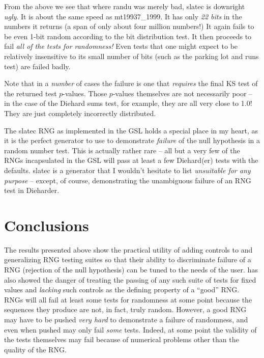 \documentclass{book}
\begin{document}
From the above we see that where randu was merely bad, slatec is
downright {\em ugly}.  It is about the same speed as mt19937\_1999.  It
has only {\em 22 bits} in the numbers it returns (a span of only about
four million numbers!)  It again fails to be even 1-bit random according
to the bit distribution test.  It then proceeds to fail {\em all of the
tests for randomness!} Even tests that one might expect to be relatively
insensitive to its small number of bits (such as the parking lot and
runs test) are failed badly.

Note that in a {\em number} of cases the failure is one that {\em
requires} the final KS test of the returned test $p$-values.  Those
$p$-values themselves are not necessarily poor -- in the case of the
Diehard sums test, for example, they are all very close to 1.0!  They
are just completely incorrectly distributed.

The slatec RNG as implemented in the GSL holds a special place in my
heart, as it is the perfect generator to use to demonstrate {\em
failure} of the null hypothesis in a random number test.  This is
actually rather rare -- all but a very few of the RNGs incapsulated in
the GSL will pass at least a few Diehard(er) tests with the defaults.
slatec is a generator that I wouldn't hesitate to list {\em unsuitable
for any purpose} -- except, of course, demonstrating the unambiguous
failure of an RNG test in Dieharder.

\chapter{Conclusions}

The \die results presented above show the practical utility of adding
controls to and generalizing RNG testing suites so that their ability to
discriminate failure of a RNG (rejection of the null hypothesis) can be
tuned to the needs of the user.  \die has also showed the danger of
treating the passing of any such suite of tests for fixed values and
{\em lacking} such controls as the defining property of a ``good'' RNG.
RNGs will all fail at least some tests for randomness at some point
because the sequences they produce are not, in fact, truly random.
However, a good RNG may have to be pushed {\em very hard} to demonstrate
a failure of randomness, and even when pushed may only fail {\em some}
tests.  Indeed, at some point the validity of the tests themselves may
fail because of numerical problems other than the quality of the RNG.
\end{document}
